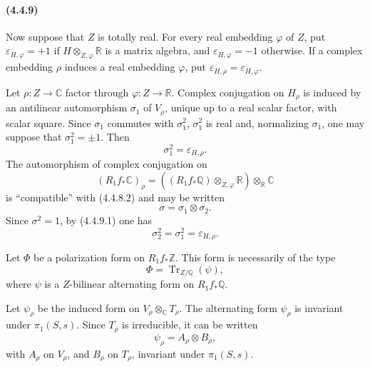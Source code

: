 \documentclass[10pt]{article}
\newcommand{\C}{\mathbb C}
\newcommand{\Q}{\mathbb Q}
\newcommand{\Z}{\mathbb Z}
\newcommand{\R}{\mathbb R}
\newcommand{\Tr}{\operatorname{Tr}}
\begin{document}
\paragraph{(4.4.9)} Now suppose that $Z$ is totally real. For every real embedding $\varphi$ of $Z$, put $\varepsilon_{H,\varphi}=+1$ if $H\otimes_{Z,\varphi}\R$ is a matrix algebra, and $\varepsilon_{H,\varphi}=-1$ otherwise. If a complex embedding $\rho$ induces a real embedding $\varphi$, put $\varepsilon_{H,\rho}=\varepsilon_{H,\varphi}$.

Let $\rho:Z\to\C$ factor through $\varphi:Z\to\R$. Complex conjugation on $H_\rho$ is induced by an antilinear automorphism $\sigma_1$ of $V_\rho$, unique up to a real scalar factor, with scalar square. Since $\sigma_1$ commutes with $\sigma_1^2$, $\sigma_1^2$ is real and, normalizing $\sigma_1$, one may suppose that $\sigma_1^2=\pm1$. Then
\[
\tag{4.4.9.1}
\sigma_1^2=\varepsilon_{H,\rho}.
\]
The automorphism of complex conjugation on
\[
(R_1f_*\C)_\rho=((R_1f_*\Q)\otimes_{Z,\varphi}\R)\otimes_\R\C
\]
is ``compatible'' with (4.4.8.2) and may be written
\[
\sigma=\sigma_1\otimes\sigma_2.
\]
Since $\sigma^2=1$, by (4.4.9.1) one has
\[
\tag{4.4.9.2}
\sigma_2^2=\sigma_1^2=\varepsilon_{H,\rho}.
\]

Let $\Phi$ be a polarization form on $R_1f_*\Z$. This form is necessarily of the type
\[
\Phi=\Tr_{Z/\Q}(\psi),
\]
where $\psi$ is a $Z$-bilinear alternating form on $R_1f_*\Q$.

Let $\psi_\rho$ be the induced form on $V_\rho\otimes_\C T_\rho$. The alternating form $\psi_\rho$ is invariant under $\pi_1(S,s)$. Since $T_\rho$ is irreducible, it can be written
\[
\tag{4.4.9.3}
\psi_\rho=A_\rho\otimes B_\rho,
\]
with $A_\rho$ on $V_\rho$, and $B_\rho$ on $T_\rho$, invariant under $\pi_1(S,s)$.
\end{document}
